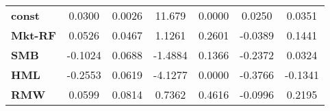 \begin{center}
\begin{tabular}{lcccccc}
\midrule
\textbf{const}  &       0.0300       &       0.0026       &      11.679     &      0.0000      &       0.0250      &       0.0351       \\
\textbf{Mkt-RF} &       0.0526       &       0.0467       &      1.1261     &      0.2601      &      -0.0389      &       0.1441       \\
\textbf{SMB}    &      -0.1024       &       0.0688       &     -1.4884     &      0.1366      &      -0.2372      &       0.0324       \\
\textbf{HML}    &      -0.2553       &       0.0619       &     -4.1277     &      0.0000      &      -0.3766      &      -0.1341       \\
\textbf{RMW}    &       0.0599       &       0.0814       &      0.7362     &      0.4616      &      -0.0996      &       0.2195       \\
\bottomrule
\end{tabular}
\end{center}
